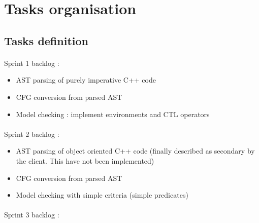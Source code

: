 \documentclass{report}
\begin{document}
\section{Tasks organisation}

\subsection{Tasks definition}

\paragraph{}
\hspace{4mm}Sprint 1 backlog :

\vspace{1.5mm}
\begin{itemize}
\item AST parsing of purely imperative C++ code\vspace{1mm}
\item CFG conversion from parsed AST\vspace{1mm}
\item Model checking : implement environments and CTL operators\vspace{1mm}
\end{itemize}

\paragraph{}
\hspace{4mm}Sprint 2 backlog :

\vspace{1.5mm}
\begin{itemize}
\item AST parsing of object oriented C++ code (finally described as secondary by the client. This have not been implemented)\vspace{1mm}
\item CFG conversion from parsed AST\vspace{1mm}
\item Model checking with simple criteria (simple predicates)\vspace{1mm}
\end{itemize}

\paragraph{}
\hspace{4mm}Sprint 3 backlog :
\end{document}
